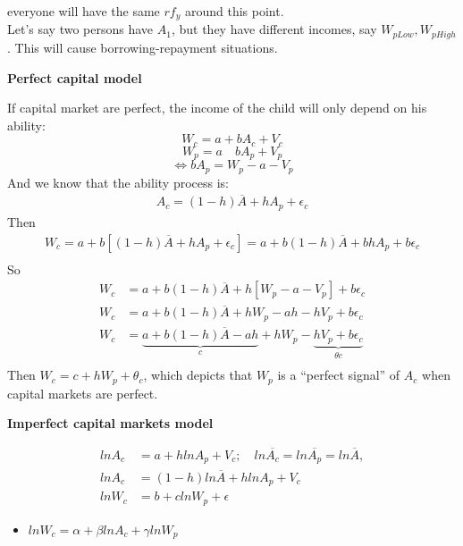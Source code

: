 \documentclass[14pt,notitlepage]{article}
\begin{document}
everyone will have the same $rf_y$ around this point.\\
Let's say two persons have $A_1$, but they have different incomes, say $W_{p Low}, W_{p High}$. This will cause borrowing-repayment situations.


\textbf{Perfect capital model}

If capital market are perfect, the income of the child will only depend on his ability:
\begin{equation}
W_c = a + b A_c + V_c
\end{equation}
\begin{equation}
W_p = a \quad b A_p + V_p
\end{equation}
\begin{equation*}
\Leftrightarrow b A_p = W_p - a - V_p
\end{equation*}
And we know that the ability process is:
\begin{align*}
A_c = (1-h)\overline{A} + h A_p + \epsilon_c
\end{align*}
Then
\begin{align*}
W_c = a + b[(1-h)\overline{A} + h A_p + \epsilon_c] = a + b(1-h)\overline{A} + b h A_p + b \epsilon_c \\
\end{align*}
So
\begin{align*}
W_c &= a + b(1-h)\overline{A} + h[W_p - a - V_p] + b\epsilon_c \\
W_c &= a + b(1-h)\overline{A} + hW_p - ah - hV_p + b\epsilon_c \\
W_c &= \underbrace{a + b(1-h)\overline{A} - ah}_{c} + hW_p - \underbrace{h V_p + b \epsilon_c}_{\theta c} \\
\end{align*}
Then $W_c = c + h W_p + \theta_c$, which depicts that $W_p$ is a ``perfect signal'' of $A_c$ when capital markets are perfect.

\textbf{Imperfect capital markets model}

\begin{align*}
ln A_c &= a + h ln A_p + V_c; \quad ln \overline{A_c} = ln \overline{A_p} = ln \overline{A}, \\
ln A_c &= (1-h) ln \overline{A} + h ln A_p + V_c \\
ln W_c &= b + c ln W_p + \epsilon
\end{align*}
\begin{itemize}
\item $ln W_c = \alpha + \beta ln A_c + \gamma ln W_p$
\end{itemize}
\end{document}
